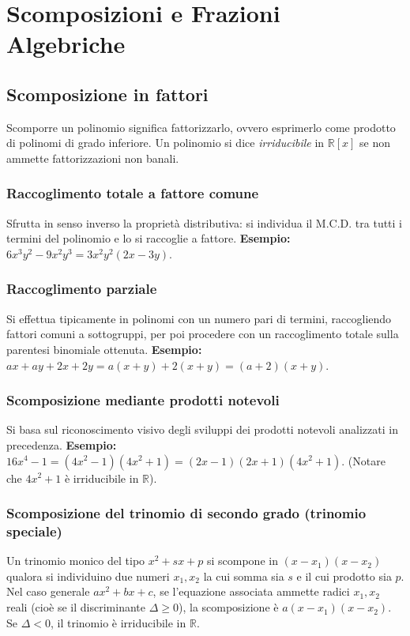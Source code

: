 \section{Scomposizioni e Frazioni Algebriche}
\subsection{Scomposizione in fattori}
Scomporre un polinomio significa fattorizzarlo, ovvero esprimerlo come prodotto di polinomi di grado inferiore. Un polinomio si dice \textit{irriducibile} in $\mathbb{R}[x]$ se non ammette fattorizzazioni non banali.

\subsubsection{Raccoglimento totale a fattore comune}
Sfrutta in senso inverso la proprietà distributiva: si individua il M.C.D. tra tutti i termini del polinomio e lo si raccoglie a fattore.
\textbf{Esempio:} $6x^3y^2 - 9x^2y^3 = 3x^2y^2(2x - 3y)$.

\subsubsection{Raccoglimento parziale}
Si effettua tipicamente in polinomi con un numero pari di termini, raccogliendo fattori comuni a sottogruppi, per poi procedere con un raccoglimento totale sulla parentesi binomiale ottenuta.
\textbf{Esempio:} $ax + ay + 2x + 2y = a(x+y) + 2(x+y) = (a+2)(x+y)$.

\subsubsection{Scomposizione mediante prodotti notevoli}
Si basa sul riconoscimento visivo degli sviluppi dei prodotti notevoli analizzati in precedenza.
\textbf{Esempio:} $16x^4 - 1 = (4x^2 - 1)(4x^2 + 1) = (2x - 1)(2x + 1)(4x^2 + 1)$. (Notare che $4x^2+1$ è irriducibile in $\mathbb{R}$).

\subsubsection{Scomposizione del trinomio di secondo grado (trinomio speciale)}
Un trinomio monico del tipo $x^2 + sx + p$ si scompone in $(x-x_1)(x-x_2)$ qualora si individuino due numeri $x_1, x_2$ la cui somma sia $s$ e il cui prodotto sia $p$.
Nel caso generale $ax^2 + bx + c$, se l'equazione associata ammette radici $x_1, x_2$ reali (cioè se il discriminante $\Delta \ge 0$), la scomposizione è $a(x-x_1)(x-x_2)$. Se $\Delta < 0$, il trinomio è irriducibile in $\mathbb{R}$.

